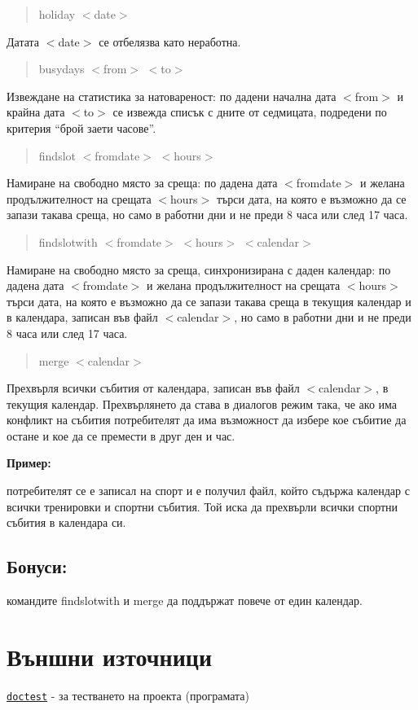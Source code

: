 \begin{quote}
holiday $<$date$>$ \end{quote}


Датата $<$date$>$ се отбелязва като неработна.

\begin{quote}
busydays $<$from$>$ $<$to$>$ \end{quote}


Извеждане на статистика за натовареност\+: по дадени начална дата $<$from$>$ и крайна дата $<$to$>$ се извежда списък с дните от седмицата, подредени по критерия “брой заети часове”.

\begin{quote}
findslot $<$fromdate$>$ $<$hours$>$ \end{quote}


Намиране на свободно място за среща\+: по дадена дата $<$fromdate$>$ и желана продължителност на срещата $<$hours$>$ търси дата, на която е възможно да се запази такава среща, но само в работни дни и не преди 8 часа или след 17 часа.

\begin{quote}
findslotwith $<$fromdate$>$ $<$hours$>$ $<$calendar$>$ \end{quote}


Намиране на свободно място за среща, синхронизирана с даден календар\+: по дадена дата $<$fromdate$>$ и желана продължителност на срещата $<$hours$>$ търси дата, на която е възможно да се запази такава среща в текущия календар и в календара, записан във файл $<$calendar$>$, но само в работни дни и не преди 8 часа или след 17 часа.

\begin{quote}
merge $<$calendar$>$ \end{quote}


Прехвърля всички събития от календара, записан във файл $<$calendar$>$, в текущия календар. Прехвърлянето да става в диалогов режим така, че ако има конфликт на събития потребителят да има възможност да избере кое събитие да остане и кое да се премести в друг ден и час.

{\bfseries Пример\+:}

потребителят се е записал на спорт и е получил файл, който съдържа календар с всички тренировки и спортни събития. Той иска да прехвърли всички спортни събития в календара си.

\subsection*{Бонуси\+:}

командите findslotwith и merge да поддържат повече от един календар.

\subsection*{}

\section*{Външни източници}


\begin{DoxyItemize}
\item \href{https://github.com/onqtam/doctest}{\tt doctest} -\/ за тестването на проекта (програмата) 
\end{DoxyItemize}